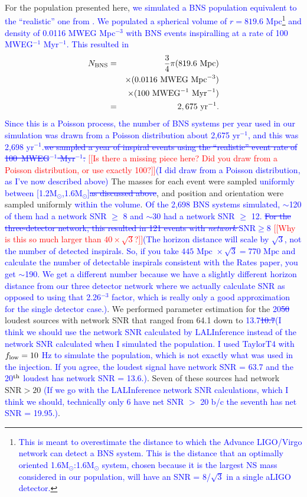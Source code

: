 \documentclass[twocolumn,prd,amssymb,aps,nofootinbib,showpacs,epsf]{revtex4}
\newcommand{\red}{\textcolor{red}}
\newcommand\les[2]{\textcolor{blue}{{#1}\sout{#2}}}
\begin{document}
\begin{enumerate}
For the population presented here, \les{we simulated a BNS population equivalent to the ``realistic'' one from \cite{LIGORate2010}.  We populated a spherical volume of $r=819.6$ Mpc\footnote{\les{This is meant to overestimate the distance to which the Advance LIGO/Virgo network can detect a BNS system.  This is the distance that an optimally oriented 1.6M$_\odot$:1.6M$_\odot$ system, chosen because it is the largest NS mass considered in our population, will have an SNR = 8/$\sqrt{3}$ in a single aLIGO detector.}{}} and density of 0.0116 MWEG Mpc$^{-3}$ with BNS events inspiralling at a rate of 100 MWEG$^{-1}$ Myr$^{-1}$.  This resulted in
\begin{eqnarray}
N_{\rm BNS}&=&\frac{3}{4}\pi(819.6\mbox{ Mpc})\\
\nonumber
&&\times(0.0116\mbox{ MWEG Mpc}^{-3})\\
\nonumber
&&\times(100\mbox{ MWEG}^{-1}\mbox{ Myr}^{-1})\\
\nonumber
&=&2,675\mbox{ yr}^{-1}.
\end{eqnarray}
Since this is a Poisson process, the number of BNS systems per year used in our simulation was drawn from a Poisson distribution about 2,675 yr$^{-1}$, and this was 2,698 yr$^{-1}$.}{we sampled a year of inspiral events using the ``realistic'' event rate of 100~MWEG$^{-1}$ Myr$^{-1}$.} \red{[[Is there a missing piece here? Did you draw from a Poisson distribution, or use exactly 100?]]}\les{(I did draw from a Poisson distribution, as I've now described above)}{} The masses for each event were sampled \les{uniformly between [1.2M$_\odot$,1.6M$_\odot$]}{as discussed above}, and position and orientation were sampled uniformly \les{within the volume}{}.  \les{Of the 2,698 BNS systems simulated, $\sim$120 of them had a network SNR $\ge$ 8 and $\sim$30 had a network SNR $\ge$ 12.}{ For the three-detector network, this resulted in 121 events with \textit{network} $\text{SNR} \ge 8$} \red{[[Why is this so much larger than $40\times\sqrt{3}$?]]}\les{(The horizon distance will scale by $\sqrt{3}$, not the number of detected inspirals.  So, if you take $445\mbox{ Mpc }\times\sqrt{3}=770\mbox{ Mpc}$ and calculate the number of detectable inspirals consistent with the Rates paper, you get $\sim$190.  We get a different number because we have a slightly different horizon distance from our three detector network where we actually calculate SNR as opposed to using that 2.26$^{-3}$ factor, which is really only a good approximation for the single detector case.)}{}. We performed parameter estimation for the \les{20}{50} loudest sources with network SNR that ranged from 64.1 down to \les{13.7}{10.7}\les{(I think we should use the network SNR calculated by LALInference instead of the network SNR calculated when I simulated the population.  I used TaylorT4 with $f_{\rm low}=10$ Hz to simulate the population, which is not exactly what was used in the injection.  If you agree, the loudest signal have network SNR = 63.7 and the 20$^{\rm th}$ loudest has network SNR = 13.6.)}{}. Seven of these sources had network $\text{SNR} > 20$ \les{(If we go with the LALInference network SNR calculations, which I think we should, technically only 6 have net SNR $>$ 20 b/c the seventh has net SNR = 19.95.)}{}.


\end{enumerate}
\end{document}
